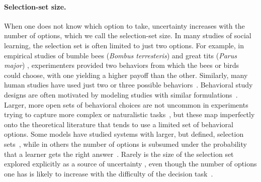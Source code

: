 \documentclass[letterpaper,11.5pt]{scrartcl}
\newcommand{\mt}[1]{{\textcolor{myorange} {({\tiny MT:} #1)}}}
\begin{document}
\paragraph{Selection-set size.}
When one does not know which option to take, uncertainty increases with the number of options, which we call the selection-set size.
In many studies of social learning, the selection set is often limited to just two options.  For example, in empirical studies of bumble bees (\emph{Bombus
terresteris}) \citep{Baracchi2018} and great tits (\emph{Parus major}) \citep{Aplin2017}, experimenters provided two behaviors from which the bees or birds
could choose, with one yielding a higher payoff than the other. %
Similarly, many human studies have used just two or three possible
behaviors~\citep{McElreath2005,Morgan2012, Toyokawa2019}. Behavioral study designs are
often motivated by modeling studies with similar formulations~\citep{Rogers1988,boyd1995does,Feldman1996,
perreault2012bayesian}.
Larger, more open sets of behavioral choices are not uncommon in experiments trying to capture more complex or naturalistic tasks~\citep{derex2013, wasielewski2014}, but these map imperfectly onto the theoretical literature that tends to use a limited set of behavioral options.
Some models have studied systems with larger, but defined, selection sets~\citep{Rendell2010, lindstrom2016co}, while in others the number of options is subsumed under the probability that a learner gets the right  answer~\citep{Feldman1996,Enquist2007}.
Rarely is the size of the selection set explored explicitly as a source of  uncertainty \citep[though see][]{Muthukrishna2016a}, even though the number of options one has is likely to increase with the difficulty of the decision task~\citep{haynes2009testing,white2009testing}.  
\end{document}
